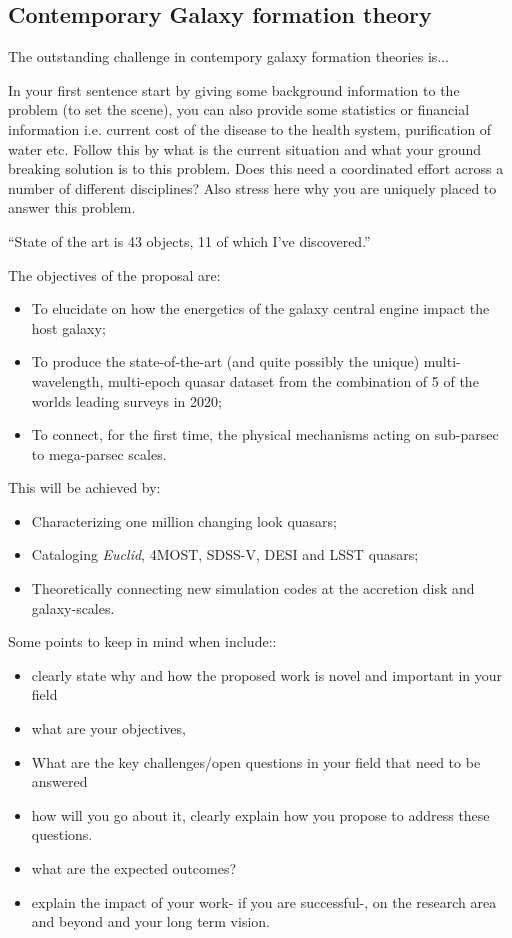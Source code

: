 \documentclass[oneside, a4paper, onecolumn, 11pt]{article}
\begin{document}
\subsection{Contemporary Galaxy formation theory}
The outstanding challenge in contempory galaxy formation theories is...

In your first sentence start by giving some background information to the problem (to set the scene), you can also provide some statistics or financial information i.e. current cost of the disease to the health system, purification of water etc. Follow this by what is the current situation and what your ground breaking solution is to this problem. Does this need a coordinated effort across a number of different disciplines? Also stress here why you are uniquely placed to answer this problem.

``State of the art is 43 objects, 11 of which I've discovered.''

The objectives of the proposal are:
\begin{itemize}
\item To elucidate on how the energetics of the galaxy central engine impact the host galaxy;
\item To produce the state-of-the-art (and quite possibly the unique) multi-wavelength, multi-epoch 
quasar dataset from the combination of 5 of the worlds leading surveys in 2020; 
\item To connect, for the first time, the physical mechanisms acting on sub-parsec to mega-parsec scales. 
\end{itemize}

This will be achieved by:
\begin{itemize}
\item Characterizing one million changing look quasars;
\item Cataloging {\it Euclid}, 4MOST, SDSS-V, DESI and LSST quasars; 
\item Theoretically connecting new simulation codes at the accretion disk and galaxy-scales. 
\end{itemize}

Some points to keep in mind when include::
\begin{itemize}
\item clearly state why and how the proposed work is novel and important in your field
\item what are your objectives,
\item What are the key challenges/open questions in your field that need to be answered 
\item how will you go about it, clearly explain how you propose to address these questions. 
\item what are the expected outcomes?
\item  explain the impact of your work- if you are successful-, on the research area and beyond and your long term vision.
\end{itemize}
\end{document}
